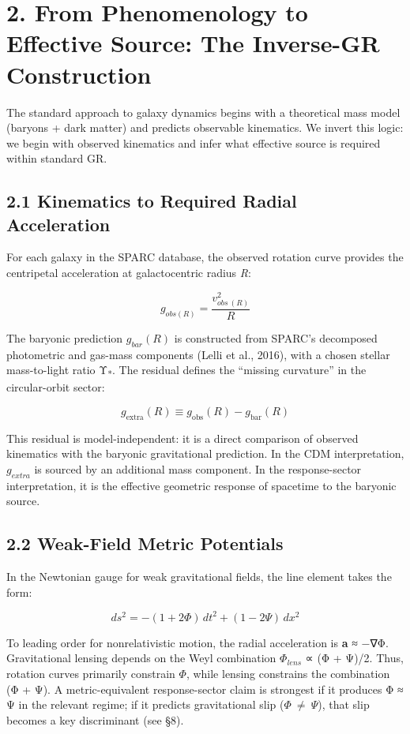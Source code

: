 \section{2. From Phenomenology to Effective Source: The Inverse-GR Construction}\label{from-phenomenology-to-effective-source-the-inverse-gr-construction}

The standard approach to galaxy dynamics begins with a theoretical mass model (baryons + dark matter) and predicts observable kinematics. We invert this logic: we begin with observed kinematics and infer what effective source is required within standard GR.

\subsection{2.1 Kinematics to Required Radial Acceleration}\label{kinematics-to-required-radial-acceleration}

For each galaxy in the SPARC database, the observed rotation curve provides the centripetal acceleration at galactocentric radius \emph{R}:

\[g_{obs(R)} = \frac{v_{obs\ (R)}^{2}}{R}\]

The baryonic prediction \(g_{bar}(R)\) is constructed from SPARC's decomposed photometric and gas-mass components (Lelli et al., 2016), with a chosen stellar mass-to-light ratio Υ\textsubscript{*}. The residual defines the ``missing curvature'' in the circular-orbit sector:

\[g_{\text{extra}}(R) \equiv g_{\text{obs}}(R) - g_{\text{bar}}(R)\]

This residual is model-independent: it is a direct comparison of observed kinematics with the baryonic gravitational prediction. In the CDM interpretation, \(g_{extra}\) is sourced by an additional mass component. In the response-sector interpretation, it is the effective geometric response of spacetime to the baryonic source.

\subsection{2.2 Weak-Field Metric Potentials}\label{weak-field-metric-potentials}

In the Newtonian gauge for weak gravitational fields, the line element takes the form:

\[ds^{2} = - (1 + 2\Phi)\, dt^{2} + (1 - 2\Psi)\, dx^{2}\]

To leading order for nonrelativistic motion, the radial acceleration is \textbf{a} ≈ −∇Φ. Gravitational lensing depends on the Weyl combination \(\Phi_{lens}\) ∝ (Φ + Ψ)/2. Thus, rotation curves primarily constrain \(\Phi\), while lensing constrains the combination (Φ + Ψ). A metric-equivalent response-sector claim is strongest if it produces Φ ≈ Ψ in the relevant regime; if it predicts gravitational slip (\(\Phi\  \neq \ \Psi\)), that slip becomes a key discriminant (see §8).

